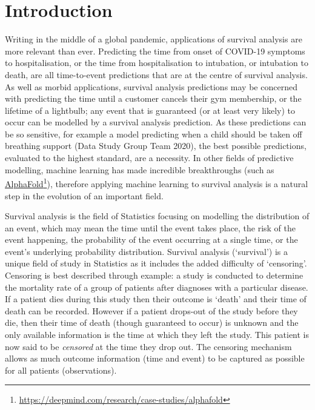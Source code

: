 \documentclass[
  letterpaper,
]{scrbook}
\theoremstyle{plain}
\theoremstyle{definition}
\theoremstyle{remark}
\begin{document}

\hypertarget{sec-intro}{%
\chapter{Introduction}\label{sec-intro}}

Writing in the middle of a global pandemic, applications of survival
analysis are more relevant than ever. Predicting the time from onset of
COVID-19 symptoms to hospitalisation, or the time from hospitalisation
to intubation, or intubation to death, are all time-to-event predictions
that are at the centre of survival analysis. As well as morbid
applications, survival analysis predictions may be concerned with
predicting the time until a customer cancels their gym membership, or
the lifetime of a lightbulb; any event that is guaranteed (or at least
very likely) to occur can be modelled by a survival analysis prediction.
As these predictions can be so sensitive, for example a model predicting
when a child should be taken off breathing support (Data Study Group
Team 2020), the best possible predictions, evaluated to the highest
standard, are a necessity. In other fields of predictive modelling,
machine learning has made incredible breakthroughs (such as
\href{https://deepmind.com/research/case-studies/alphafold}{AlphaFold}\footnote{\url{https://deepmind.com/research/case-studies/alphafold}}),
therefore applying machine learning to survival analysis is a natural
step in the evolution of an important field.

Survival analysis is the field of Statistics focusing on modelling the
distribution of an event, which may mean the time until the event takes
place, the risk of the event happening, the probability of the event
occurring at a single time, or the event's underlying probability
distribution. Survival analysis (`survival') is a unique field of study
in Statistics as it includes the added difficulty of `censoring'.
Censoring is best described through example: a study is conducted to
determine the mortality rate of a group of patients after diagnoses with
a particular disease. If a patient dies during this study then their
outcome is `death' and their time of death can be recorded. However if a
patient drops-out of the study before they die, then their time of death
(though guaranteed to occur) is unknown and the only available
information is the time at which they left the study. This patient is
now said to be \emph{censored} at the time they drop out. The censoring
mechanism allows as much outcome information (time and event) to be
captured as possible for all patients (observations).
\end{document}

